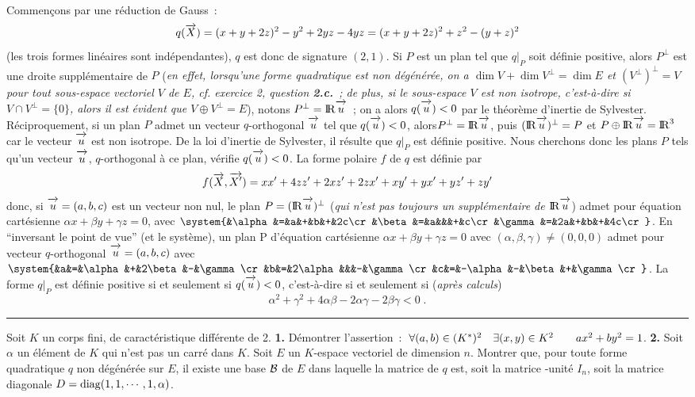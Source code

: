 \documentclass{article}
\begin{document}
Commen\c cons par une r\'eduction de Gauss~:\vv
$$q(\vect{X}) =  (x+y+2z)^2-y^2+2yz-4yz =  (x+y+2z)^2+z^2-(y+z)^2$$
(les trois formes lin\'eaires sont ind\'ependantes), $q$ est donc de signature $(2,1)$.
\msk
Si $P$ est un plan tel que $q|_P$ soit d\'efinie positive, alors $P^\perp$ est une droite suppl\'ementaire de $P$ ({\it en effet, lorsqu'une forme quadratique est non d\'eg\'en\'er\'ee, on a $\dim V+\dim V^\perp=\dim E$ et $(V^\perp)^\perp=V$ pour tout sous-espace vectoriel $V$ de $E$, cf. exercice 2, question {\bf 2.c.}~; de plus, si le sous-espace $V$ est non isotrope, c'est-\`a-dire si $V\cap V^\perp=\{0\}$, alors il est \'evident que $V\oplus V^\perp=E$}), notons $P^\perp=\rmat\vect{u}$~; on a alors $q(\vect{u})<0$ par le th\'eor\`eme d'inertie de Sylvester.\msk
R\'eciproquement, si un plan $P$ admet un vecteur $q$-orthogonal $\vect{u}$ tel que $q(\vect{u})<0$, alors\break $P^\perp=\rmat\vect{u}$, puis $(\rmat\vect{u})^\perp=P$ et $P\oplus\rmat\vect{u}=\rmat^3$ car le vecteur $\vect{u}$ est non isotrope. De la loi d'inertie de Sylvester, il r\'esulte que $q|_P$ est d\'efinie positive.\bsk
Nous cherchons donc les plans $P$ tels qu'un vecteur $\vect{u}$, $q$-orthogonal \`a ce plan, v\'erifie $q(\vect{u})<0$. La forme polaire $f$ de $q$ est d\'efinie par\vv
$$f(\vect{X},\vect{X'})=xx'+4zz'+2xz'+2zx'+xy'+yx'+yz'+zy'$$
donc, si $\vect{u}=(a,b,c)$ est un vecteur non nul, le plan $P=(\rmat\vect{u})^\perp$ ({\it qui n'est pas toujours un suppl\'ementaire de $\rmat\vect{u}$}) admet pour \'equation cart\'esienne $\alpha x+\beta y+\gamma z=0$, avec $\system{&\alpha&=&a&+&b&+&2c\cr &\beta&=&a&&&+&c\cr &\gamma&=&2a&+&b&+&4c\cr}$. En ``inversant le point de vue'' (et le syst\`eme), un plan P d'\'equation cart\'esienne $\alpha x+\beta y+\gamma z=0$
avec $(\alpha,\beta,\gamma)\not=(0,0,0)$ admet pour vecteur $q$-orthogonal $\vect{u}=(a,b,c)$ avec $\system{&a&=&\alpha&+&2\beta&-&\gamma\cr &b&=&2\alpha&&&-&\gamma\cr &c&=&-\alpha&-&\beta&+&\gamma\cr}$. La forme $q|_P$ est d\'efinie positive si et seulement si $q(\vect{u})<0$, c'est-\`a-dire si et seulement si ({\it apr\`es calculs})\vv
$$\alpha^2+\gamma^2+4\alpha\beta-2\alpha\gamma-2\beta\gamma<0\;.$$

\bsk
\hrule
\bsk

Soit $K$ un corps fini, de caract\'eristique diff\'erente de 2.\msk
{\bf 1.} D\'emontrer l'assertion~: $\;\forall(a,b)\in(K^*)^2\quad\exists(x,y)\in K^2\qquad ax^2+by^2=1$.
\msk
{\bf 2.} Soit $\alpha$ un \'el\'ement de $K$ qui n'est pas un carr\'e dans $K$. Soit $E$ un $K$-espace vectoriel de dimension $n$. Montrer que, pour toute forme quadratique $q$ non d\'eg\'en\'er\'ee sur $E$, il existe une base ${\cal B}$ de $E$ dans laquelle la matrice de $q$ est, soit la matrice -unit\'e $I_n$, soit la matrice diagonale $D=\mathop{\rm diag}\nolimits(1,1,\cdots,1,\alpha)$.
\end{document}
